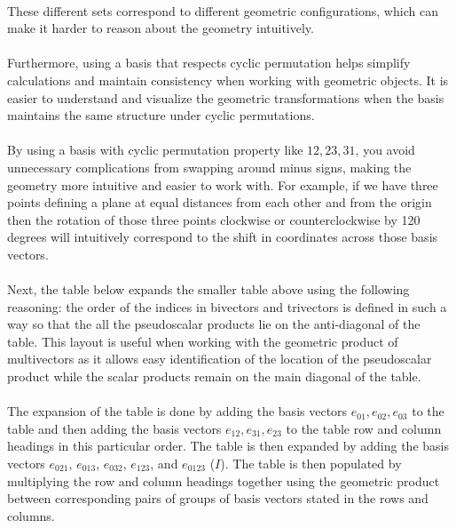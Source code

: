 \documentclass{article}
\begin{document}
\begin{enumerate}
    \paragraph{}
        These different sets correspond to different geometric configurations, which can make it harder to reason about the 
        geometry intuitively.
    \paragraph{}
        Furthermore, using a basis that respects cyclic permutation helps simplify calculations and maintain consistency 
        when working with geometric objects. It is easier to understand and visualize the geometric transformations when 
        the basis maintains the same structure under cyclic permutations.
    \paragraph{}
        By using a basis with cyclic permutation property like ${12, 23, 31}$, you avoid unnecessary complications from 
        swapping around minus signs, making the geometry more intuitive and easier to work with. For example, if we have 
        three points defining a plane at equal distances from each other and from the origin then the rotation of those 
        three points clockwise or counterclockwise by 120 degrees will intuitively correspond to the shift in coordinates 
        across those basis vectors.
    \paragraph{}
        Next, the table below expands the smaller table above using the following reasoning: the order of the indices in bivectors and trivectors
        is defined in such a way so that the all the pseudoscalar products lie on the anti-diagonal of the table. This layout is
        useful when working with the geometric product of multivectors as it allows easy identification of the location of the pseudoscalar
        product while the scalar products remain on the main diagonal of the table.
    \paragraph{}
        The expansion of the table is done by adding the basis vectors $e_{01}, e_{02}, e_{03}$ to the table and then adding the
        basis vectors $e_{12}, e_{31}, e_{23}$ to the table row and column headings in this particular order.
        The table is then expanded by adding the basis vectors $e_{021}$, $e_{013}$, $e_{032}$, $e_{123}$, and 
        $e_{0123}$ ($I$). The table is then populated by multiplying the row and column
        headings together using the geometric product between corresponding pairs of groups of basis vectors stated in 
        the rows and columns.

\end{enumerate}
\end{document}
